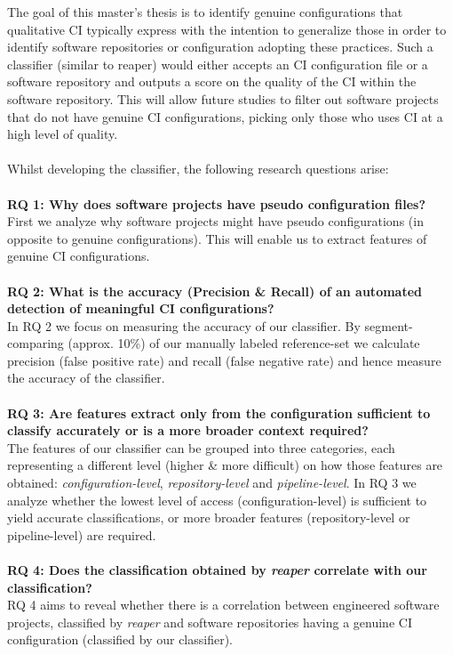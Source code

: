 \documentclass{task_description}
\begin{document}
The goal of this master's thesis is to identify genuine configurations that qualitative CI typically express with the intention to generalize those in order to identify software repositories or configuration adopting these practices. Such a classifier (similar to reaper) would either accepts an CI configuration file or a software repository and outputs a score on the quality of the CI within the software repository. This will allow future studies to filter out software projects that do not have genuine CI configurations, picking only those who uses CI at a high level of quality.
\\\\
Whilst developing the classifier, the following research questions arise:
\\\\
\textbf{RQ 1: Why does software projects have pseudo configuration files?}\\
First we analyze why software projects might have pseudo configurations (\ie in opposite to genuine configurations). This will enable us to extract features of genuine CI configurations.
\\\\
\textbf{RQ 2: What is the accuracy (Precision \& Recall) of an automated detection of meaningful CI configurations?}\\
In RQ 2 we focus on measuring the accuracy of our classifier. By segment-comparing (approx. 10\%) of our manually labeled reference-set we calculate precision (false positive rate) and recall (false negative rate) and hence measure the accuracy of the classifier.
\\\\
\textbf{RQ 3: Are features extract only from the configuration sufficient to classify accurately or is a more broader context required?}\\
The features of our classifier can be grouped into three categories, each representing a different level (\ie higher \& more difficult) on how those features are obtained: \textit{configuration-level}, \textit{repository-level} and \textit{pipeline-level}. In RQ 3 we analyze whether the lowest level of access (configuration-level) is sufficient to yield accurate classifications, or more broader features (repository-level or pipeline-level) are required.
\\\\
\textbf{RQ 4: Does the classification obtained by \textit{reaper} correlate with our classification?}\\
RQ 4 aims to reveal whether there is a correlation between engineered software projects, classified by \textit{reaper} and software repositories having a genuine CI configuration (classified by our classifier).
\end{document}
